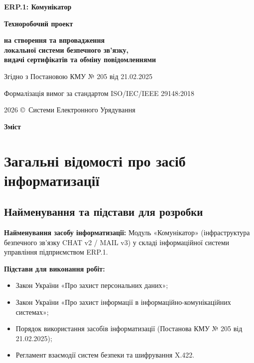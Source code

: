 \documentclass{article}
\newcommand\HUGE[1]{\fontsize{38}{38}\selectfont #1}
\begin{document}
\pagestyle{fancy}

\begin{titlepage}
\AddToShipoutPictureBG*{\AtPageLowerLeft{\color{primary}\rule{\paperwidth}{\paperheight}}}
\color{white}\thispagestyle{empty}\vspace*{3cm}\centering
  {\Huge  \textbf{ ERP.1: Комунікатор } \par} \vspace{1.5cm}
  {\HUGE  \textbf{ Техноробочий проект } \par} \vspace{1.5cm}
  {\LARGE \textbf{ на створення та впровадження \\
                   локальної системи безпечного зв'язку, \\
                   видачі сертифікатів та обміну повідомленнями} \par} \vspace{1.5cm}
  {\large Згідно з Постановою КМУ № 205 від 21.02.2025 \par}
  {\large Формалізація вимог за стандартом ISO/IEC/IEEE 29148:2018 \par} \vfill
  {\large 2026 \copyright\ Системи Електронного Урядування \par}
\end{titlepage}

\newpage

\begin{center} {\Huge\color{primary}\bfseries Зміст\par} \end{center} \vspace{40pt}

\tableofcontents

\newpage

\section{Загальні відомості про засіб інформатизації}

\subsection{Найменування та підстави для розробки}

\textbf{Найменування засобу інформатизації:} Модуль «Комунікатор» (інфраструктура безпечного зв'язку CHAT v2 / MAIL v3)
у складі інформаційної системи управління підприємством ERP.1.

\textbf{Підстави для виконання робіт:}
\begin{itemize}
    \item Закон України «Про захист персональних даних»;
    \item Закон України «Про захист інформації в інформаційно-комунікаційних системах»;
    \item Порядок використання засобів інформатизації (Постанова КМУ № 205 від 21.02.2025);
    \item Регламент взаємодії систем безпеки та шифрування X.422.
\end{itemize}
\end{document}
